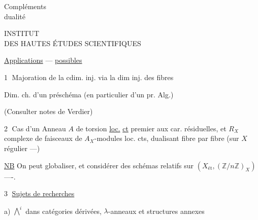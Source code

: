 \begin{flushright}
Compléments\\
dualité
\end{flushright}
\begin{center}
INSTITUT\\
DES HAUTES ÉTUDES SCIENTIFIQUES
\end{center}
\uline{Applications} --- \uline{possibles}

\textcircled{1} Majoration de la cdim. inj. via la dim inj. des fibres

Dim. ch.  d'un préschéma (en particulier d'un pr. Alg.)

(Consulter notes de Verdier)

\textcircled{2} Cas d'un Anneau $A$ de torsion \uline{loc.} \uline{ct} premier aux car. résiduelles, et $R_X$ complexe de faisceaux de $A_X$-modules \unsure{\{}loc. cts, dualisant fibre par fibre (sur $X$ régulier ---)

\uline{NB} On peut globaliser, et considérer des schémas relatifs sur $(X_{\text{ét}},(\mathbb{Z}/n\mathbb{Z})_X)$ ----.

\textcircled{3} 
\uline{Sujets de recherches}

a) $\bigwedge^i$ dans catégories dérivées, $\lambda$-anneaux et structures annexes

